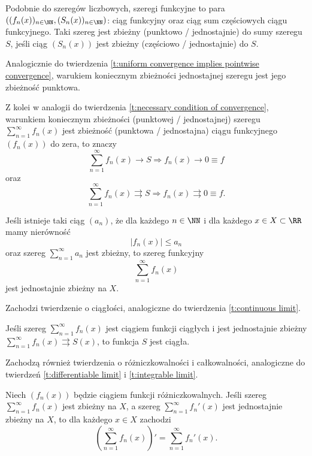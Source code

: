 Podobnie do szeregów liczbowych, szeregi funkcyjne to para $((f_n(x))_{n\in\NN}, (S_n(x))_{n\in\NN})$: ciąg funkcyjny oraz ciąg sum częściowych ciągu funkcyjnego. Taki szereg jest zbieżny (punktowo / jednostajnie) do sumy szeregu $S$, jeśli ciąg $(S_n(x))$ jest zbieżny (częściowo / jednostajnie) do $S$.

Analogicznie do twierdzenia \ref{t:uniform convergence implies pointwise convergence}, warukiem koniecznym zbieżności jednostajnej szeregu jest jego zbieżność punktowa.

Z kolei w analogii do twierdzenia \ref{t:necessary condition of convergence}, warunkiem koniecznym zbieżności (punktowej / jednostajnej) szeregu $\sum_{n=1}^\infty f_n(x)$ jest zbieżność (punktowa / jednostajna) ciągu funkcyjnego $(f_n(x))$ do zera, to znaczy
\[ \sum_{n=1}^\infty f_n(x) \rightarrow S \Longrightarrow f_n(x) \rightarrow 0 \equiv f \]
oraz
\[ \sum_{n=1}^\infty f_n(x) \rightrightarrows S \Longrightarrow f_n(x) \rightrightarrows 0 \equiv f. \]

\begin{theorem}
    Jeśli istnieje taki ciąg $(a_n)$, że dla każdego $n \in \NN$ i dla każdego $x \in X \subset \RR$ mamy nierówność
    \[ |f_n(x)| \leq a_n \]
    oraz szereg $\sum_{n=1}^\infty a_n$ jest zbieżny, to szereg funkcyjny
    \[ \sum_{n=1}^\infty f_n(x) \]
    jest jednostajnie zbieżny na $X$.
\end{theorem}

Zachodzi twierdzenie o ciągłości, analogiczne do twierdzenia \ref{t:continuous limit}.

\begin{theorem}
    Jeśli szereg $\sum_{n=1}^\infty f_n(x)$ jest ciągiem funkcji ciągłych i jest jednostajnie zbieżny $\sum_{n=1}^\infty f_n(x) \rightrightarrows S(x)$, to funkcja $S$ jest ciągła.
\end{theorem}

Zachodzą również twierdzenia o różniczkowalności i całkowalności, analogiczne do twierdzeń \ref{t:differentiable limit} i \ref{t:integrable limit}.

\begin{theorem}
    Niech $(f_n(x))$ będzie ciągiem funkcji różniczkowalnych. Jeśli szereg $\sum_{n=1}^\infty f_n(x)$ jest zbieżny na $X$, a szereg $\sum_{n=1}^\infty f_n'(x)$ jest jednostajnie zbieżny na $X$, to dla każdego $x \in X$ zachodzi
    \[ \left(\sum_{n=1}^\infty f_n(x)\right)' = \sum_{n=1}^\infty f_n'(x). \]
\end{theorem}

